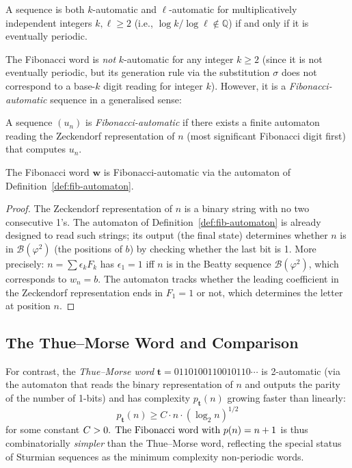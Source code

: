 \begin{theorem}%
  \label{thm:cobham}
  A sequence is both \(k\)-automatic and \(\ell\)-automatic for
  multiplicatively independent integers \(k,\ell\geq 2\) (i.e.,
  \(\log k/\log\ell\notin\mathbb{Q}\)) if and only if it is
  eventually periodic.
\end{theorem}

The Fibonacci word is \emph{not} \(k\)-automatic for any integer
\(k\geq 2\) (since it is not eventually periodic, but its generation
rule via the substitution \(\sigma\) does not correspond to a base-\(k\)
digit reading for integer \(k\)).  However, it is a
\emph{Fibonacci-automatic} sequence in a generalised sense:

\begin{definition}\label{def:fib-automatic}
  A sequence \((u_n)\) is \emph{Fibonacci-automatic} if there exists
  a finite automaton reading the Zeckendorf representation of \(n\)
  (most significant Fibonacci digit first) that computes \(u_n\).
\end{definition}

\begin{theorem}%
  \label{thm:fib-automatic}
  The Fibonacci word \(\mathbf{w}\) is Fibonacci-automatic via the
  automaton of Definition~\ref{def:fib-automaton}.
\end{theorem}
\begin{proof}
  The Zeckendorf representation of \(n\) is a binary string with no
  two consecutive 1's.  The automaton of Definition~\ref{def:fib-automaton}
  is already designed to read such strings; its output (the final
  state) determines whether \(n\) is in \(\mathcal{B}(\varphi^2)\)
  (the positions of \(b\)) by checking whether the last bit is 1.
  More precisely: \(n = \sum \epsilon_k F_k\) has \(\epsilon_1=1\)
  iff \(n\) is in the Beatty sequence \(\mathcal{B}(\varphi^2)\),
  which corresponds to \(w_n=b\).  The automaton tracks whether
  the leading coefficient in the Zeckendorf representation ends
  in \(F_1=1\) or not, which determines the letter at position \(n\).
\end{proof}

\subsection{The Thue--Morse Word and Comparison}
\label{subsec:ch19-thue-morse}

For contrast, the \emph{Thue--Morse word}
\(\mathbf{t} = 0110100110010110\cdots\) is 2-automatic (via the
automaton that reads the binary representation of \(n\) and outputs
the parity of the number of 1-bits) and has complexity \(p_{\mathbf{t}}(n)\)
growing faster than linearly:
\[
  p_{\mathbf{t}}(n) \geq C\cdot n \cdot (\log_2 n)^{1/2}
\]
for some constant \(C>0$.  The Fibonacci word with \(p(n)=n+1\)
is thus combinatorially \emph{simpler} than the Thue--Morse word,
reflecting the special status of Sturmian sequences as the minimum
complexity non-periodic words.

